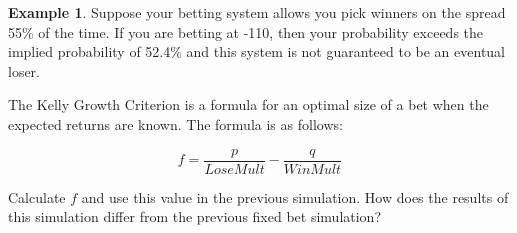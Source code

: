 \documentclass[
  11pt,
]{book}
\theoremstyle{definition}
\theoremstyle{definition}
\newtheorem{example}{Example}[chapter]
\theoremstyle{definition}
\theoremstyle{definition}
\theoremstyle{remark}
\begin{document}
\begin{example}
Suppose your betting system allows you pick winners on the spread 55\% of the time. If you are betting at -110, then your probability exceeds the implied probability of 52.4\% and this system is not guaranteed to be an eventual loser.

The Kelly Growth Criterion is a formula for an optimal size of a bet when the expected returns are known. The formula is as follows:

\[f = \frac{p}{LoseMult} - \frac{q}{WinMult}\]

Calculate \(f\) and use this value in the previous simulation. How does the results of this simulation differ from the previous fixed bet simulation?
\end{example}

\vspace{1in}
\end{document}
